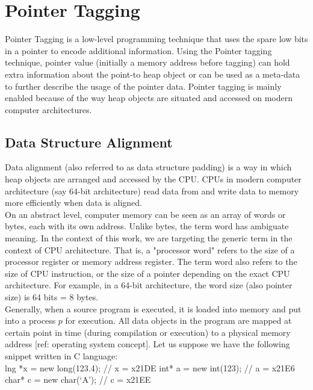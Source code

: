 \section{Pointer Tagging}
\label{sec:preliminaries:pointertagging}

Pointer Tagging is a low-level programming technique that uses the spare low bits in a pointer to encode additional information. Using the Pointer tagging technique, pointer value (initially a memory address before tagging) can hold extra information about the point-to heap object or can be used as a meta-data to further describe the usage of the pointer data. Pointer tagging is mainly enabled because of the way heap objects are situated and accessed on modern computer architectures.

\subsection{Data Structure Alignment}
\label{sec:preliminaries:data_alignment}
Data alignment (also referred to as data structure padding) is a way in which heap objects are arranged and accessed by the CPU. CPUs in modern computer architecture (say 64-bit architecture) read data from and write data to memory more efficiently when data is aligned.  \\

On an abstract level, computer memory can be seen as an array of words or bytes, each with its own address. Unlike bytes, the term word has ambiguate meaning. In the context of this work, we are targeting the generic term in the context of CPU architecture. That is, a "processor word" refers to the size of a processor register or memory address register. The term word also refers to the size of CPU instruction, or the size of a pointer depending on the exact CPU architecture. For example, in a 64-bit architecture, the word size (also pointer size) is 64 bits = 8 bytes. \\

Generally, when a source program is executed, it is loaded into memory and put into a process $p$ for execution. All data objects in the program are mapped at certain point in time (during compilation or execution) to a physical memory address [ref: operating system concept]. Let us suppose we have the following snippet written in C language: \\

lng *x = new long(123.4); // x = x21DE
int* a = new int(123);  // a = x21E6
char* c = new char(‘A’);  // c = x21EE

